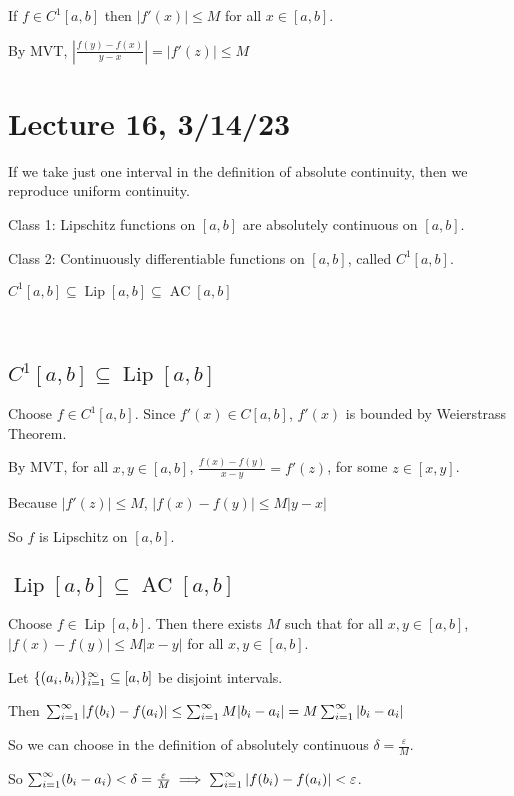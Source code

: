 \documentclass[x11names,reqno,14pt]{extarticle}
\newcommand{\seq}[2][\oo]{_{#2 = 1}^#1}
\DeclareMathOperator{\AC}{AC}
\DeclareMathOperator{\Lip}{Lip}
\begin{document}
If $f\in C^1[a,b]$ then $|f'(x)|\leq M$ for all $x \in [a, b]$. 

By MVT, $|\frac{f(y) - f(x)}{y - x}| = |f'(z)| \leq M$

\section*{Lecture 16, 3/14/23}

\rem If we take just one interval in the definition of absolute continuity, then we reproduce uniform continuity. 

Class 1: Lipschitz functions on $[a, b]$ are absolutely continuous  on $[a, b]$. 

Class 2: Continuously differentiable functions on $[a, b]$, called $C^1[a,b]$. 

\prop 

$C^1[a, b]\subseteq \Lip[a,b]\subseteq \AC[a,b]$

\proof\,

\subsection*{$C^1[a,b]\subseteq\Lip[a,b]$}

Choose $f \in C^1[a,b]$. Since $f'(x)\in C[a,b]$, $f'(x)$ is bounded by Weierstrass Theorem. 

By MVT, for all $x, y \in [a, b]$, $\frac{f(x) - f(y)}{x - y} = f'(z)$, for some $z \in [x, y]$. 

Because $|f'(z)| \leq M$, $|f(x) - f(y)| \leq M|y - x|$

So $f$ is Lipschitz on $[a, b]$.

\subsection*{$\Lip[a,b]\subseteq\AC[a,b]$}

Choose $f \in \Lip[a,b]$. Then there exists $M$ such that for all $x, y \in[a, b]$, $|f(x) - f(y)| \leq M|x - y|$ for all $x, y \in [a,b]$. 

Let $\{(a_i, b_i)\}\seq{i} \subseteq[a,b]$ be disjoint intervals. 

Then $\sum\seq{i}|f(b_i) - f(a_i)| \leq \sum\seq{i}M|b_i - a_i| = M \sum\seq{i}|b_i - a_i|$

So we can choose in the definition of absolutely continuous $\delta = \frac{\varepsilon}{M}$. 

So $\sum\seq{i}(b_i - a_i) < \delta = \frac{\varepsilon}{M} \implies \sum\seq{i}|f(b_i) - f(a_i)| < \varepsilon$. 
\end{document}
